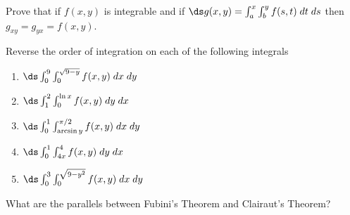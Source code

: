 \begin{enumialphparenastyle}
\begin{ex}
Prove that if $f(x,y)$ is integrable and if $\ds g(x,y)=\int_a^x
    \int_b^y f(s,t) \; dt \; ds$ then $g_{xy}=g_{yx}=f(x,y)$.
\end{ex}

\begin{ex}
Reverse the order of integration on each of the following integrals
\begin{enumerate}
	\item $\ds\int_0^9 \int_0^{\sqrt{9-y}} f(x,y)\; dx \; dy$
	\item $\ds\int_1^2 \int_0^{\ln x} f(x,y) \; dy \; dx $
	\item $\ds\int_0^1 \int_{\arcsin y}^{\pi/2} f(x,y) \; dx \; dy$
	\item $\ds\int_0^1 \int_{4x}^{4} f(x,y) \; dy \; dx$
	\item $\ds\int_0^3 \int_{0}^{\sqrt{9-y^2}} f(x,y) \; dx \; dy$
\end{enumerate}
\end{ex}

\begin{ex}
What are the parallels between Fubini's
    Theorem and Clairaut's Theorem?
\end{ex}

\end{enumialphparenastyle}